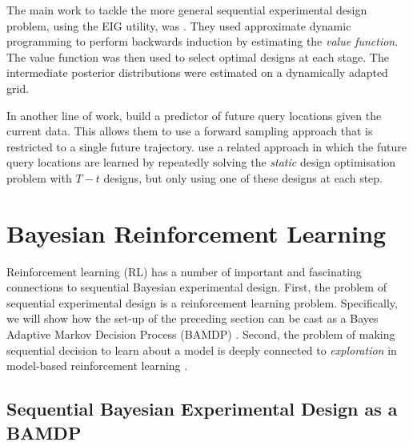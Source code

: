 \documentclass[a4paper, 10pt]{report}
\theoremstyle{plain}
\begin{document}
	The main work to tackle the more general sequential experimental design problem, using the EIG utility, was \citet{huan2016sequential}.
	They used approximate dynamic programming to perform backwards induction by estimating the \emph{value function}.
	The value function was then used to select optimal designs at each stage.
	The intermediate posterior distributions were estimated on a dynamically adapted grid.
	
	In another line of work, \citet{gonzalez2016glasses} build a predictor of future query locations given the current data.
	This allows them to use a forward sampling approach that is restricted to a single future trajectory.
	\citet{jiang2020binoculars} use a related approach in which the future query locations are learned by repeatedly solving the \emph{static} design optimisation problem with $T-t$ designs, but only using one of these designs at each step.
	
	
	
	
	\section{Bayesian Reinforcement Learning}
	\label{sec:brl}
	
	Reinforcement learning (RL) \citep{sutton1990integrated,szepesvari2010algorithms} has a number of important and fascinating connections to sequential Bayesian experimental design. First, the problem of sequential experimental design is a reinforcement learning problem. Specifically, we will show how the set-up of the preceding section can be cast as a Bayes Adaptive Markov Decision Process (BAMDP) \citep{ross2007bayes,guez2012efficient,ghavamzadeh2016bayesian}.
	Second, the problem of making sequential decision to learn about a model is deeply connected to \emph{exploration} in model-based reinforcement learning \citep{sun2011planning,shyam2019model,sekar2020planning}.
	
	
	\subsection{Sequential Bayesian Experimental Design as a BAMDP}
	
\end{document}
